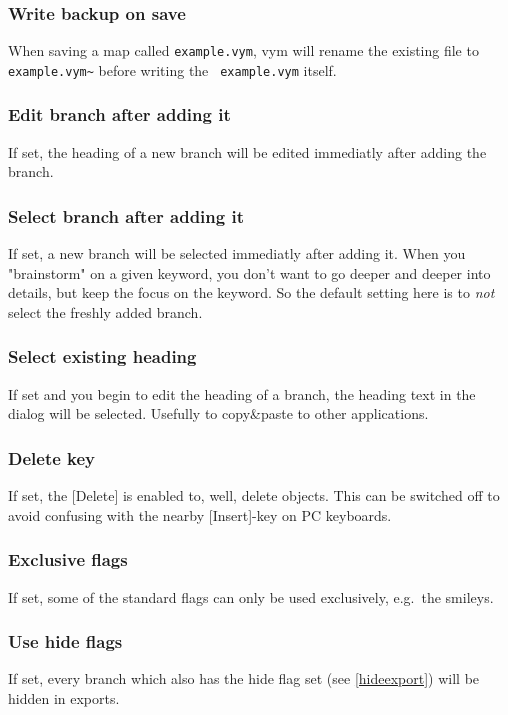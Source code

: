 \documentclass[12pt,a4paper]{article}
\newcommand{\vym}{{\sc vym }}
\newcommand{\key}[1]{[#1]}
\begin{document}
\begin{appendix}
\subsubsection*{Write backup on save}
    When saving a map called {\tt example.vym}, \vym will rename the
    existing file to {\tt example.vym\~{}} before writing the {\tt
    example.vym} itself.

\subsubsection*{Edit branch after adding it}
    If set, the heading of a new branch will be edited immediatly after
    adding the branch.

\subsubsection*{Select branch after adding it}
    If set, a new branch will be selected immediatly after adding it.
    When you "brainstorm" on a given keyword, you don't want to go
    deeper and deeper into details, but keep the focus on the keyword.
    So the default setting here is to {\em not} select the freshly added
    branch.
    
\subsubsection*{Select existing heading}
    If set and you begin to edit the heading of a branch, the heading
    text in the dialog will be selected. Usefully to copy\&paste to
    other applications.

\subsubsection*{Delete key}
    If set, the \key{Delete} is enabled to, well, delete objects. This
    can be switched off to avoid confusing with the nearby
    \key{Insert}-key on PC keyboards.

\subsubsection*{Exclusive flags}
    If set, some of the standard flags can only be used exclusively,
    e.g.~the smileys.

\subsubsection*{Use hide flags}
    If set, every branch which also has the hide flag set (see
    \ref{hideexport}) will be hidden in exports.


\end{appendix}
\end{document}
